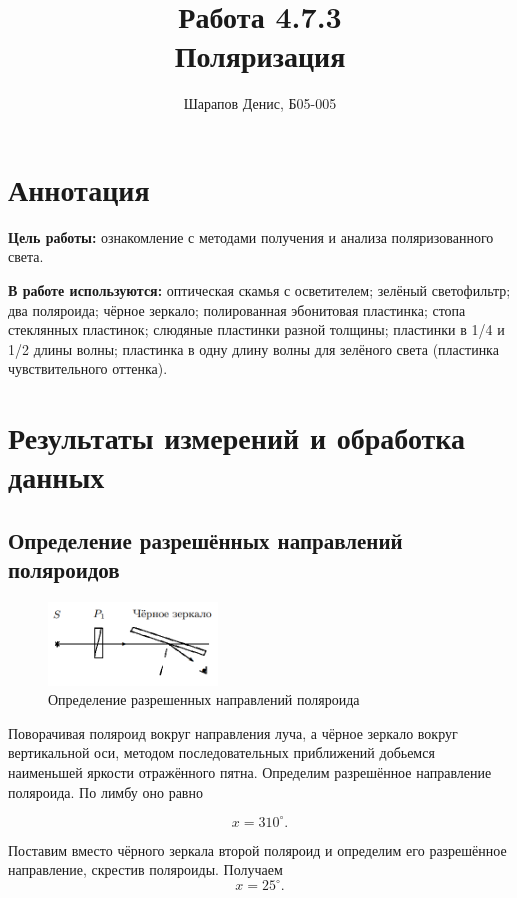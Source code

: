 \documentclass[a4paper]{article}
\title{Работа 4.7.3 \\ Поляризация}
\author{Шарапов Денис, Б05-005}
\date{}
\begin{document}
    \maketitle
    \tableofcontents
    \newpage
    
\section{Аннотация}

\noindent\textbf{Цель работы:} ознакомление с методами получения и анализа поляризованного света. \smallskip
 
\noindent \textbf{В работе используются:} оптическая скамья с осветителем; зелёный светофильтр; два поляроида; чёрное зеркало; полированная эбонитовая пластинка; стопа стеклянных пластинок; слюдяные пластинки разной толщины; пластинки в 1/4 и 1/2 длины волны; пластинка в одну длину волны для зелёного света (пластинка чувствительного оттенка).

\section{Результаты измерений и обработка данных}

\subsection{Определение разрешённых направлений поляроидов}

\begin{figure}[ht!]
    \centering
    \includegraphics[width = 0.40\textwidth]{image/pic1.png}
    \caption{Определение разрешенных направлений поляроида}
\end{figure}

\noindent Поворачивая поляроид вокруг направления луча, а чёрное зеркало вокруг вертикальной оси, методом последовательных приближений добьемся наименьшей яркости отражённого пятна. Определим разрешённое направление поляроида. По лимбу оно равно

$$ x = 310^{\circ}. $$

\noindent Поставим вместо чёрного зеркала второй поляроид и определим
его разрешённое направление, скрестив поляроиды. Получаем $$ x = 25^{\circ}.$$
 
\end{document}
